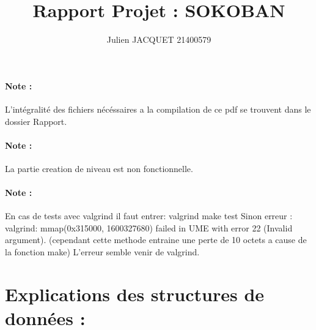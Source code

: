 \documentclass[a4paper]{article}
\title {Rapport Projet : SOKOBAN}
\author{Julien JACQUET 21400579}
\begin{document}
  \maketitle
  \newpage

  \paragraph{Note :}
  L'intégralité des fichiers nécéssaires a la compilation de ce pdf se trouvent dans le dossier Rapport.
  \paragraph{Note :}
  La partie creation de niveau est non fonctionnelle.
  \paragraph{Note :}
  En cas de tests avec valgrind il faut entrer:   \hfill \break
  valgrind make test   \hfill \break
  Sinon erreur : valgrind: mmap(0x315000, 1600327680) failed in UME with error 22 (Invalid argument).  \hfill \break
  (cependant cette methode entraine une perte de 10 octets a cause de la fonction make)   \hfill \break
  L'erreur semble venir de valgrind.

  \section{Explications des structures de données :}

  
\end{document}
